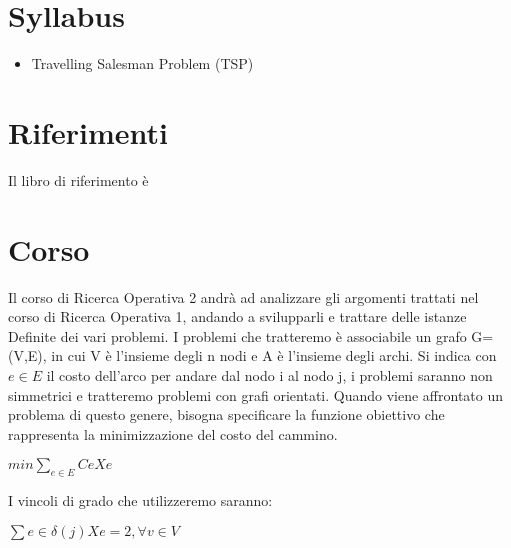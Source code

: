 

\section{Syllabus}

\begin{itemize}
    \item Travelling Salesman Problem (TSP)
    




\end{itemize}

\section{Riferimenti}

Il libro di riferimento è 

\section{Corso}
Il corso di Ricerca Operativa 2 andrà ad analizzare gli argomenti trattati nel corso di Ricerca Operativa 1, andando a svilupparli e trattare delle istanze Definite dei vari problemi.
I problemi che tratteremo è associabile un grafo G=(V,E), in cui V è l'insieme degli n nodi e A è l'insieme degli archi. Si indica con $e\in E$  il costo dell'arco per andare dal nodo i al nodo j, i problemi saranno non simmetrici e tratteremo problemi con grafi orientati.
Quando viene affrontato un problema di questo genere, bisogna specificare la funzione obiettivo che rappresenta la minimizzazione del costo del cammino.
\begin{center}
$ min \sum_{e \in E} Ce Xe $ 
\end{center}

 I vincoli di grado che utilizzeremo saranno: 
\begin{center}
$ \sum {e \in \delta(j)} Xe =2 , \forall v \in V$
\end{center}




